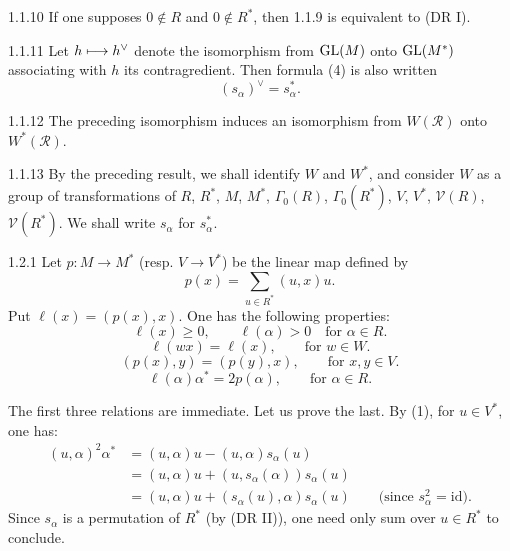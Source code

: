 \begin{remark}{1.1.10}\label{XXI.1.1.10}
If one supposes $0\notin R$ and $0\notin R^*$, then 1.1.9 is equivalent to (DR I).
\end{remark}
\begin{corollary}{1.1.11}\label{XXI.1.1.11}
Let $h\longmapsto h^\vee$ denote the isomorphism from $\operatorname{GL}(M)$ onto $\operatorname{GL}(M^*)$ associating with $h$ its contragredient. Then formula (4) is also written
\begin{equation}\tag{5}\label{XXI.eq.5}
(s_\alpha)^\vee=s_\alpha^*.
\end{equation}
\end{corollary}
\begin{corollary}{1.1.12}\label{XXI.1.1.12}
The preceding isomorphism induces an isomorphism from $W(\mathcal R)$ onto $W^*(\mathcal R)$.
\end{corollary}
\begin{scholium}{1.1.13}\label{XXI.1.1.13}
By the preceding result, we shall identify $W$ and $W^*$, and consider $W$ as a group of transformations of $R$, $R^*$, $M$, $M^*$, $\Gamma_0(R)$, $\Gamma_0(R^*)$, $V$, $V^*$, $\mathcal V(R)$, $\mathcal V(R^*)$. We shall write $s_\alpha$ for $s_\alpha^*$.
\end{scholium}

\begin{lemma}{1.2.1}\label{XXI.1.2.1}
Let $p:M\to M^*$ (resp. $V\to V^*$) be the linear map defined by
\begin{equation}\tag{6}\label{XXI.eq.6}
p(x)=\sum_{u\in R^*}(u,x)u.
\end{equation}
Put $\ell(x)=(p(x),x)$. One has the following properties:
\begin{equation}\tag{7}\label{XXI.eq.7}
\ell(x)\geq0,\qquad\ell(\alpha)>0\quad\text{for }\alpha\in R.
\end{equation}
\begin{equation}\tag{8}\label{XXI.eq.8}
\ell(wx)=\ell(x),\qquad\text{for }w\in W.
\end{equation}
\begin{equation}\tag{9}\label{XXI.eq.9}
(p(x),y)=(p(y),x),\qquad\text{for }x,y\in V.
\end{equation}
\begin{equation}\tag{10}\label{XXI.eq.10}
\ell(\alpha)\alpha^*=2p(\alpha),\qquad\text{for }\alpha\in R.
\end{equation}
\end{lemma}
The first three relations are immediate.{\renewcommand{\thefootnote}{(3)}} Let us prove the last. By (1), for $u\in V^*$, one has:
\[
\begin{aligned}
(u,\alpha)^2\alpha^*&=(u,\alpha)u-(u,\alpha)s_\alpha(u)\\
&=(u,\alpha)u+(u,s_\alpha(\alpha))s_\alpha(u)\\
&=(u,\alpha)u+(s_\alpha(u),\alpha)s_\alpha(u)\qquad\text{(since }s_\alpha^2=\mathrm{id}\text{).}
\end{aligned}
\]
Since $s_\alpha$ is a permutation of $R^*$ (by (DR II)), one need only sum over $u\in R^*$ to conclude.

